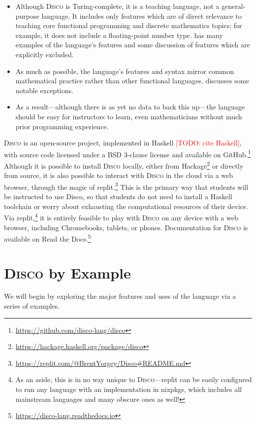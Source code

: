 \documentclass[submission,copyright,creativecommons]{eptcs}
\newcommand{\disco}{\textsc{Disco}\xspace}
\newcommand{\pref}[1]{\prettyref{#1}}
\newcommand{\todo}[1]{\textcolor{red}{[TODO: #1]}}
\newcommand{\todo}[1]{}
\begin{document}
\begin{itemize}
\item Although \disco is Turing-complete, it is a teaching language,
  not a general-purpose language.  It includes only features which are
  of direct relevance to teaching core functional programming and
  discrete mathematics topics; for example, it does not include a
  floating-point number type.  \pref{sec:examples} has many examples
  of the language's features and some discussion of features which are
  explicitly excluded.
\item As much as possible, the language's features and syntax mirror
  common mathematical practice rather than other functional
  languages.  \pref{sec:syntax} discusses some notable exceptions.
\item As a result---although there is as yet no data to back this
  up---the language should be easy for instructors to learn, even
  mathematicians without much prior programming experience.
\end{itemize}

\disco is an open-source project, implemented in Haskell \todo{cite
  Haskell}, with source code licensed under a BSD 3-clause license and
available on
GitHub.\footnote{\url{https://github.com/disco-lang/disco}}  Although
it is possible to install \disco locally, either from
Hackage\footnote{\url{https://hackage.haskell.org/package/disco}} or
directly from source, it is also possible to interact with \disco in
the cloud via a web browser, through the magic of
replit.\footnote{\url{https://replit.com/@BrentYorgey/Disco\#README.md}}
This is the primary way that students will be instructed to use Disco,
so that students do not need to install a Haskell toolchain or worry
about exhausting the computational resources of their device.  Via
replit,\footnote{As an aside, this is in no way unique to
  \disco---replit can be easily configured to run any language with an
  implementation in nixpkgs, which includes all mainstream languages
  and many obscure ones as well!} it is entirely feasible to play
with \disco on any device with a web browser, including Chromebooks,
tablets, or phones.  Documentation for \disco is available on Read the Docs.\footnote{\url{https://disco-lang.readthedocs.io}}

\section{\disco by Example}
\label{sec:examples}

We will begin by exploring the major features and uses of the language
via a series of examples.
\end{document}
